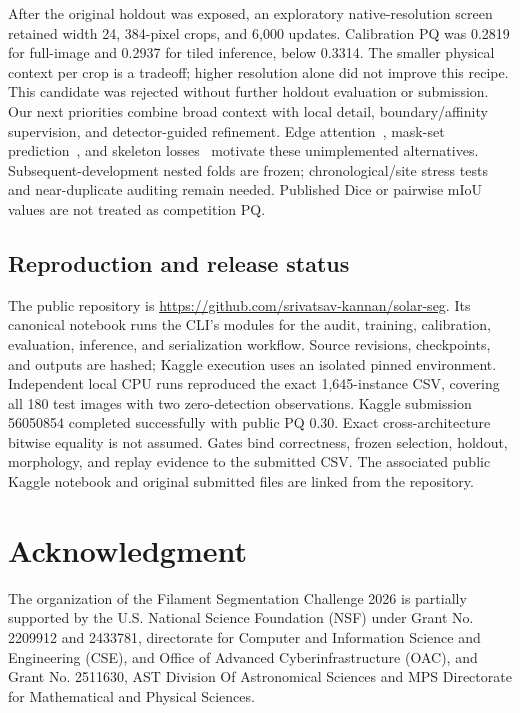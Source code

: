 \documentclass[sigconf]{acmart}
\begin{document}
After the original holdout was exposed, an exploratory native-resolution screen retained width 24, 384-pixel crops, and 6,000 updates. Calibration PQ was 0.2819 for full-image and 0.2937 for tiled inference, below 0.3314. The smaller physical context per crop is a tradeoff; higher resolution alone did not improve this recipe. This candidate was rejected without further holdout evaluation or submission. Our next priorities combine broad context with local detail, boundary/affinity supervision, and detector-guided refinement. Edge attention~\cite{edgeattnet}, mask-set prediction~\cite{mask2former}, and skeleton losses~\cite{cldice} motivate these unimplemented alternatives. Subsequent-development nested folds are frozen; chronological/site stress tests and near-duplicate auditing remain needed. Published Dice or pairwise mIoU values are not treated as competition PQ.

\subsection{Reproduction and release status}
The public repository is \url{https://github.com/srivatsav-kannan/solar-seg}. Its canonical notebook runs the CLI's modules for the audit, training, calibration, evaluation, inference, and serialization workflow. Source revisions, checkpoints, and outputs are hashed; Kaggle execution uses an isolated pinned environment. Independent local CPU runs reproduced the exact 1,645-instance CSV, covering all 180 test images with two zero-detection observations. Kaggle submission 56050854 completed successfully with public PQ 0.30. Exact cross-architecture bitwise equality is not assumed. Gates bind correctness, frozen selection, holdout, morphology, and replay evidence to the submitted CSV. The associated public Kaggle notebook and original submitted files are linked from the repository.


\clearpage
\section{Acknowledgment}\label{sec:acknowledgment}
    The organization of the Filament Segmentation Challenge 2026 is partially supported by the U.S. National Science Foundation (NSF) under Grant No. 2209912 and 2433781, directorate for Computer and Information Science and Engineering (CSE), and Office of Advanced Cyberinfrastructure (OAC), and Grant No. 2511630, AST Division Of Astronomical Sciences and MPS Directorate for Mathematical and Physical Sciences.
\end{document}
